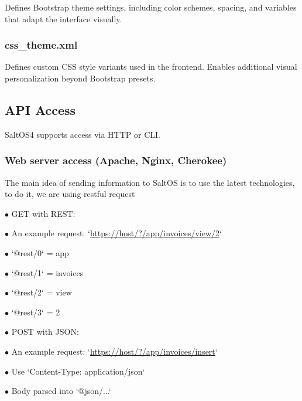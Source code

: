 \documentclass[a4paper]{article}
\def\htmladdnormallink#1#2{\href{#2}{#1}}
\begin{document}
Defines Bootstrap theme settings, including color schemes, spacing, and variables that adapt the interface visually.

\hypertarget{toc19}{}
\subsubsection{css\_theme.xml}

Defines custom CSS style variants used in the frontend. Enables additional visual personalization beyond Bootstrap presets.

\hypertarget{toc20}{}
\subsection{API Access}

SaltOS4 supports access via HTTP or CLI.

\hypertarget{toc21}{}
\subsubsection{Web server access (Apache, Nginx, Cherokee)}

The main idea of sending information to SaltOS is to use the latest technologies, to do it, we are using restful request

\begin{compactitem}
\item[\color{myblue}$\bullet$] GET with REST:
  \begin{compactitem}
  \item[\color{myblue}$\bullet$] An example request: `\htmladdnormallink{https://host/?/app/invoices/view/2}{https://host/?/app/invoices/view/2}`
  \item[\color{myblue}$\bullet$] `@rest/0` = app
  \item[\color{myblue}$\bullet$] `@rest/1` = invoices
  \item[\color{myblue}$\bullet$] `@rest/2` = view
  \item[\color{myblue}$\bullet$] `@rest/3` = 2
  \end{compactitem}
\item[\color{myblue}$\bullet$] POST with JSON:
  \begin{compactitem}
  \item[\color{myblue}$\bullet$] An example request: `\htmladdnormallink{https://host/?/app/invoices/insert}{https://host/?/app/invoices/insert}`
  \item[\color{myblue}$\bullet$] Use `Content-Type: application/json`
  \item[\color{myblue}$\bullet$] Body parsed into `@json/...`
  \end{compactitem}
\end{compactitem}
\end{document}
